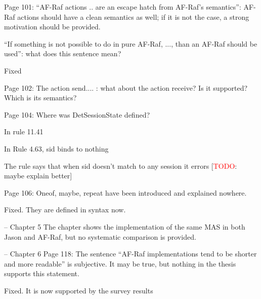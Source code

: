 \documentclass{article}
\newcommand{\todo}[1]{[\textcolor{red}{TODO}: #1]}
\newenvironment{them}{\noindent\begingroup\color{blue}}{\endgroup\par}
\begin{document}
\begin{them}

Page 101:
“AF-Raf actions .. are an escape hatch from AF-Raf's semantics”: AF-Raf actions
should have a clean semantics as well; if it is not the case, a strong
motivation should be provided.

\end{them}
\todo{}

\begin{them}

“If something is not possible to do in pure AF-Raf, ..., than an AF-Raf should
be used”: what does this sentence mean?

\end{them}
Fixed

\begin{them}

Page 102:
The action send.... : what about the action receive? Is it supported? Which is
its semantics?

\end{them}
\todo{}

\begin{them}

Page 104:
Where was DetSessionState defined?
\end{them}
In rule 11.41

\begin{them}

In Rule 4.63, sid binds to nothing
\end{them}
The rule says that when sid doesn't match to any session it errors
\todo{maybe explain better}

\begin{them}

Page 106:
Oneof, maybe, repeat have been introduced and explained nowhere.
\end{them}
Fixed. They are defined in syntax now.

\begin{them}

-- Chapter 5
The chapter shows the implementation of the same MAS in both Jason and AF-Raf,
but no systematic comparison is provided.

\end{them}
\todo{}

\begin{them}

-- Chapter 6
Page 118:
The sentence “AF-Raf implementations tend to be shorter and more readable” is
subjective. It may be true, but nothing in the thesis supports this statement.

\end{them}
Fixed. It is now supported by the survey results
\end{document}
